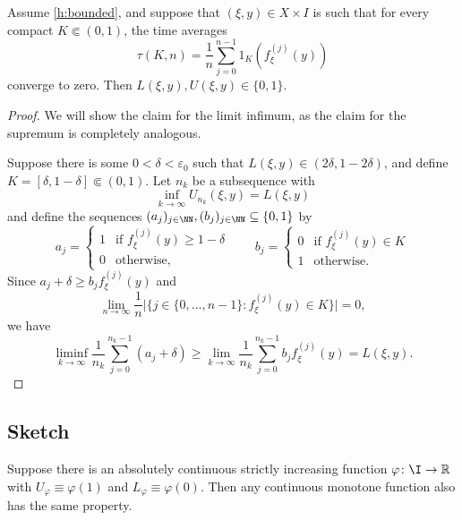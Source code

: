 \documentclass[b5paper]{memoir}
\begin{document}
\begin{lemma}
  Assume \cref{h:bounded}, and suppose that \((\xi,y) \in X \times I\) is such that for every compact \(K \Subset (0,1)\), the time averages
  \begin{equation*}
    \tau(K,n) = \frac{1}{n}\sum_{j = 0}^{n - 1} 1_K(f_{\xi}^{(j)}(y))
  \end{equation*}
  converge to zero. Then \(L(\xi,y), U(\xi,y) \in \{ 0,1 \}\).
\end{lemma}
\begin{proof}
  We will show the claim for the limit infimum, as the claim for the supremum is completely analogous.

  Suppose there is some \(0 < \delta < \varepsilon_0\) such that \(L(\xi,y) \in (2\delta, 1 - 2\delta)\), and define \(K = [\delta,1 - \delta] \Subset (0,1)\). Let \(n_k\) be a subsequence with
  \begin{equation*}
    \inf_{k \to \infty}U_{n_k}(\xi,y) = L(\xi,y)
  \end{equation*}
  and define the sequences \((a_j)_{j \in \NN},(b_j)_{j \in \NN} \subseteq \{ 0,1 \}\) by
  \[a_j =
    \begin{cases}
      1 & \text{if } f_{\xi}^{(j)}(y) \geq 1 - \delta\\
      0 & \text{otherwise},
    \end{cases}\qquad
    b_j = 
    \begin{cases}
      0 & \text{if } f_{\xi}^{(j)}(y) \in K\\
      1 & \text{otherwise}.
    \end{cases}
  \]
  Since \(a_j + \delta \geq b_j f_{\xi}^{(j)}(y)\) and
  \begin{equation*}
    \lim_{n \to \infty} \frac{1}{n} \lvert \{ j \in \{0,\dots,n - 1\} : f_{\xi}^{(j)}(y) \in K \} \rvert = 0,
  \end{equation*}
  we have
  \begin{equation*}
    \liminf_{k \to \infty}\frac{1}{n_k} \sum_{j = 0}^{n_k - 1}(a_j + \delta) \geq 
    \lim_{k \to \infty}\frac{1}{n_k} \sum_{j = 0}^{n_k - 1}b_jf_{\xi}^{(j)}(y) = L(\xi,y).
  \end{equation*}

\end{proof}



\subsection{Sketch}
\begin{lemma}
  Suppose there is an absolutely continuous strictly increasing function \(\varphi \colon \I \to \mathbb{R}\) with \(U_{\varphi} \equiv \varphi(1)\) and \(L_{\varphi} \equiv \varphi(0)\). Then any continuous monotone function also has the same property.  
\end{lemma}
\end{document}
